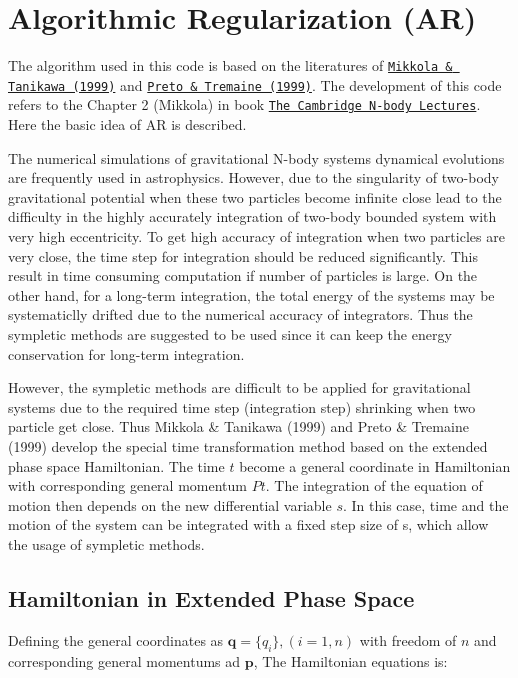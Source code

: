 \hypertarget{index_AR_sec}{}\section{Algorithmic Regularization (\+A\+R)}\label{index_AR_sec}
The algorithm used in this code is based on the literatures of \href{http://adsabs.harvard.edu/abs/1999MNRAS.310..745M}{\tt Mikkola \& Tanikawa (1999)} and \href{http://adsabs.harvard.edu/abs/1999AJ....118.2532P}{\tt Preto \& Tremaine (1999)}. The development of this code refers to the Chapter 2 (Mikkola) in book \href{http://www.springer.com/us/book/9781402084300}{\tt The Cambridge N-\/body Lectures}. Here the basic idea of AR is described.

The numerical simulations of gravitational N-\/body systems dynamical evolutions are frequently used in astrophysics. However, due to the singularity of two-\/body gravitational potential when these two particles become infinite close lead to the difficulty in the highly accurately integration of two-\/body bounded system with very high eccentricity. To get high accuracy of integration when two particles are very close, the time step for integration should be reduced significantly. This result in time consuming computation if number of particles is large. On the other hand, for a long-\/term integration, the total energy of the systems may be systematiclly drifted due to the numerical accuracy of integrators. Thus the sympletic methods are suggested to be used since it can keep the energy conservation for long-\/term integration.

However, the sympletic methods are difficult to be applied for gravitational systems due to the required time step (integration step) shrinking when two particle get close. Thus Mikkola \& Tanikawa (1999) and Preto \& Tremaine (1999) develop the special time transformation method based on the extended phase space Hamiltonian. The time $t$ become a general coordinate in Hamiltonian with corresponding general momentum $Pt$. The integration of the equation of motion then depends on the new differential variable $ s$. In this case, time and the motion of the system can be integrated with a fixed step size of s, which allow the usage of sympletic methods.\hypertarget{index_H_sec}{}\subsection{Hamiltonian in Extended Phase Space}\label{index_H_sec}
Defining the general coordinates as $ \mathbf{q} = \{q_i\}, (i=1,n) $ with freedom of $n$ and corresponding general momentums ad $ \mathbf{p} $, The Hamiltonian equations is\+:

